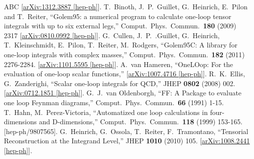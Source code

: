 \documentclass[a4paper]{article}
\begin{document}
\begin{thebibliography}{ABC}
  [\href{http://arxiv.org/abs/1312.3887}{arXiv:1312.3887 [hep-ph]}].
  T.~Binoth, J.~P.~Guillet, G.~Heinrich, E.~Pilon and T.~Reiter,
  ``Golem95: a numerical program to calculate one-loop tensor integrals with up
  to six external legs,''
  Comput.\ Phys.\ Commun.\  {\bf 180} (2009) 2317
  [\href{http://arxiv.org/abs/0810.0992}{arXiv:0810.0992 [hep-ph]}].
  G.~Cullen, J.~P.~.Guillet, G.~Heinrich, T.~Kleinschmidt, E.~Pilon, T.~Reiter, M.~Rodgers,
  ``Golem95C: A library for one-loop integrals with complex masses,''
  Comput.\ Phys.\ Commun.\  {\bf 182 } (2011)  2276-2284.
  [\href{http://arxiv.org/abs/1101.5595}{arXiv:1101.5595 [hep-ph]}].
  A.~van Hameren,
  ``OneLOop: For the evaluation of one-loop scalar functions,''
  [\href{http://arxiv.org/abs/1007.4716}{arXiv:1007.4716 [hep-ph]}].
  R.~K.~Ellis, G.~Zanderighi,
  ``Scalar one-loop integrals for QCD,''
  JHEP {\bf 0802 } (2008)  002.
  [\href{http://arxiv.org/abs/0712.1851}{arXiv:0712.1851 [hep-ph]}].
  G.~J.~van Oldenborgh,
  ``FF: A Package to evaluate one loop Feynman diagrams,''
  Comput.\ Phys.\ Commun.\  {\bf 66 } (1991)  1-15.
  T.~Hahn, M.~Perez-Victoria,
  ``Automatized one loop calculations in four-dimensions and D-dimensions,''
  Comput.\ Phys.\ Commun.\  {\bf 118 } (1999)  153-165.
  [hep-ph/9807565].
  G.~Heinrich, G.~Ossola, T.~Reiter, F.~Tramontano,
  ``Tensorial Reconstruction at the Integrand Level,''
  JHEP {\bf 1010 } (2010)  105.
  [\href{http://arxiv.org/abs/1008.2441}{arXiv:1008.2441 [hep-ph]}].
\end{thebibliography}
\end{document}
